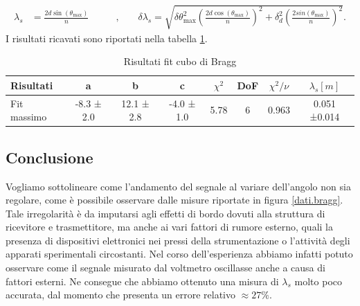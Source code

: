 \documentclass[a4paper]{article}
\begin{document}
\begin{align}
  \lambda_s &= \frac{2d \sin(\theta_{\text{max}})}{n} \qquad & \text{,}\qquad
  \delta \lambda_s = \sqrt{\delta \theta_{\text{max}}^2 ( \frac{2d \cos(\theta_{\text{max}})}{n})^2 + \delta_d^2 (\frac{2sin(\theta_{\text{max}})}{n})^2}. \label{eq:lunghezza_bragg}
\end{align}
I risultati ricavati sono riportati nella tabella \ref{tab:fit.bragg}.
\begin{table}[htbp]
\centering
\begin{tabular}{|l|ccccccc|}
\hline
Risultati & a & b & c & $\chi^2$ & DoF & $\chi^2/\nu$ & $\lambda_s [m]$  \\\hline\hline
Fit massimo & -8.3 ± 2.0 & 12.1 ± 2.8 & -4.0 ± 1.0 & 5.78 & 6 & 0.963 & 0.051 ±0.014\\\hline
\end{tabular}
\caption{Risultati fit cubo di Bragg}
\label{tab:fit.bragg}
\end{table}

\subsection{Conclusione}
Vogliamo sottolineare come l'andamento del segnale al variare dell'angolo non sia regolare, come è possibile osservare dalle misure riportate in figura \ref {dati.bragg}. Tale irregolarità è da imputarsi agli effetti di bordo dovuti alla struttura di ricevitore e trasmettitore, ma anche ai vari fattori di rumore esterno, quali la presenza di dispositivi elettronici nei pressi della strumentazione o l'attività degli apparati sperimentali circostanti. Nel corso dell'esperienza abbiamo infatti potuto osservare come il segnale misurato dal voltmetro oscillasse anche a causa di fattori esterni. Ne consegue che abbiamo ottenuto una misura di $\lambda_s$ molto poco accurata, dal momento che presenta un errore relativo $\approx 27\%$.
\end{document}
